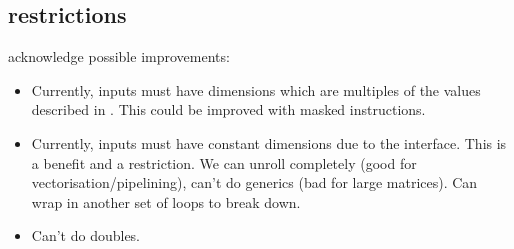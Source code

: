 \documentclass[\main/thesis.tex]{subfiles}
\begin{document}
\subsection{restrictions}
\label{sec:restrictions}
acknowledge possible improvements:
\begin{itemize}
  \item Currently, inputs must have dimensions which are multiples of the values described in . This could be improved with masked instructions.
  \item Currently, inputs must have constant dimensions due to the interface. This is a benefit and a restriction. We can unroll completely (good for vectorisation/pipelining), can't do generics (bad for large matrices). Can wrap in another set of loops to break down.
  \item Can't do doubles.
\end{itemize}
\end{document}
